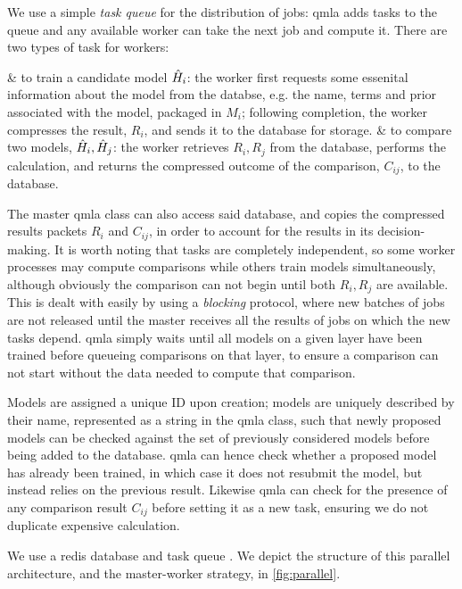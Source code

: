 \par 
We use a simple \emph{task queue} for the distribution of jobs: 
    \gls{qmla} adds tasks to the queue and any available worker can take the next job and compute it. 
There are two types of task for workers:
\begin{easylist}
    & to train a candidate model $\hat{H}_i$:
        the worker first requests some essenital information about the model from the databse, 
        e.g. the name, terms and prior associated with the model, packaged in $M_i$;
        following completion, the worker compresses the result, $R_i$, and sends it to the database for storage. 
    & to compare two models, $\hat{H}_i, \hat{H}_j$: 
        the worker retrieves $R_i, R_j$ from the database, performs the calculation, 
        and returns the compressed outcome of the comparison, $C_{ij}$, to the database. 
\end{easylist}
The master \gls{qmla} class can also access said database, and copies the compressed results packets $R_i$ and $C_{ij}$,
    in order to account for the results in its decision-making. 
It is worth noting that tasks are completely independent, so some worker processes
    may compute comparisons while others train models simultaneously, 
    although obviously the comparison can not begin until both $R_i, R_j$ are available. 
This is dealt with easily by using a \emph{blocking} protocol, 
    where new batches of jobs are not released until the master receives all the results of jobs on which the new tasks depend.
\gls{qmla} simply waits until all models on a given layer have been trained before queueing comparisons 
    on that layer, to ensure a comparison can not start without the data needed to compute that comparison. 
\par

Models are assigned a unique ID upon creation; 
    models are uniquely described by their name, represented as a string in the \gls{qmla} class, 
    such that newly proposed models can be checked against the set of previously considered models 
    before being added to the database. 
\gls{qmla} can hence check whether a proposed model has already been trained, 
    in which case it does not resubmit the model, but instead relies on the previous result. 
Likewise \gls{qmla} can check for the presence of any comparison result $C_{ij}$ before setting it as a new task, 
    ensuring we do not duplicate expensive calculation. 
\par 
We use a redis database and task queue \cite{redis, redis_queue}. 
We depict the structure of this parallel architecture, and the master-worker strategy, in \cref{fig:parallel}.

